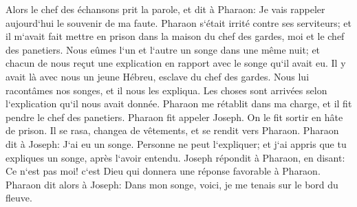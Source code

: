 \verse Alors le chef des échansons prit la parole, et dit à Pharaon: Je vais rappeler aujourd`hui le souvenir de ma faute. 
\verse Pharaon s`était irrité contre ses serviteurs; et il m`avait fait mettre en prison dans la maison du chef des gardes, moi et le chef des panetiers. 
\verse Nous eûmes l`un et l`autre un songe dans une même nuit; et chacun de nous reçut une explication en rapport avec le songe qu`il avait eu. 
\verse Il y avait là avec nous un jeune Hébreu, esclave du chef des gardes. Nous lui racontâmes nos songes, et il nous les expliqua. 
\verse Les choses sont arrivées selon l`explication qu`il nous avait donnée. Pharaon me rétablit dans ma charge, et il fit pendre le chef des panetiers. 
\verse Pharaon fit appeler Joseph. On le fit sortir en hâte de prison. Il se rasa, changea de vêtements, et se rendit vers Pharaon. 
\verse Pharaon dit à Joseph: J`ai eu un songe. Personne ne peut l`expliquer; et j`ai appris que tu expliques un songe, après l`avoir entendu. 
\verse Joseph répondit à Pharaon, en disant: Ce n`est pas moi! c`est Dieu qui donnera une réponse favorable à Pharaon. 
\verse Pharaon dit alors à Joseph: Dans mon songe, voici, je me tenais sur le bord du fleuve. 
